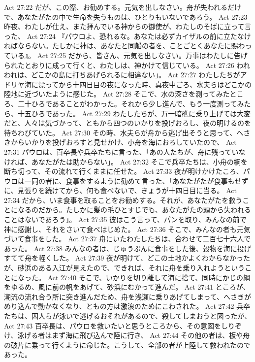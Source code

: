 Act 27:22  だが、この際、お勧めする。元気を出しなさい。舟が失われるだけで、あなたがたの中で生命を失うものは、ひとりもいないであろう。
Act 27:23  昨夜、わたしが仕え、また拝んでいる神からの御使が、わたしのそばに立って言った、
Act 27:24  『パウロよ、恐れるな。あなたは必ずカイザルの前に立たなければならない。たしかに神は、あなたと同船の者を、ことごとくあなたに賜わっている』。
Act 27:25  だから、皆さん、元気を出しなさい。万事はわたしに告げられたとおりに成って行くと、わたしは、神かけて信じている。
Act 27:26  われわれは、どこかの島に打ちあげられるに相違ない」。
Act 27:27  わたしたちがアドリヤ海に漂ってから十四日目の夜になった時、真夜中ごろ、水夫らはどこかの陸地に近づいたように感じた。
Act 27:28  そこで、水の深さを測ってみたところ、二十ひろであることがわかった。それから少し進んで、もう一度測ってみたら、十五ひろであった。
Act 27:29  わたしたちが、万一暗礁に乗り上げては大変だと、人々は気づかって、ともから四つのいかりを投げおろし、夜の明けるのを待ちわびていた。
Act 27:30  その時、水夫らが舟から逃げ出そうと思って、へさきからいかりを投げおろすと見せかけ、小舟を海におろしていたので、
Act 27:31  パウロは、百卒長や兵卒たちに言った、「あの人たちが、舟に残っていなければ、あなたがたは助からない」。
Act 27:32  そこで兵卒たちは、小舟の綱を断ち切って、その流れて行くままに任せた。
Act 27:33  夜が明けかけたころ、パウロは一同の者に、食事をするように勧めて言った、「あなたがたが食事もせずに、見張りを続けてから、何も食べないで、きょうが十四日目に当る。
Act 27:34  だから、いま食事を取ることをお勧めする。それが、あなたがたを救うことになるのだから。たしかに髪の毛ひとすじでも、あなたがたの頭から失われることはないであろう」。
Act 27:35  彼はこう言って、パンを取り、みんなの前で神に感謝し、それをさいて食べはじめた。
Act 27:36  そこで、みんなの者も元気づいて食事をした。
Act 27:37  舟にいたわたしたちは、合わせて二百七十六人であった。
Act 27:38  みんなの者は、じゅうぶんに食事をした後、穀物を海に投げすてて舟を軽くした。
Act 27:39  夜が明けて、どこの土地かよくわからなかったが、砂浜のある入江が見えたので、できれば、それに舟を乗り入れようということになった。
Act 27:40  そこで、いかりを切り離して海に捨て、同時にかじの綱をゆるめ、風に前の帆をあげて、砂浜にむかって進んだ。
Act 27:41  ところが、潮流の流れ合う所に突き進んだため、舟を浅瀬に乗りあげてしまって、へさきがめり込んで動かなくなり、ともの方は激浪のためにこわされた。
Act 27:42  兵卒たちは、囚人らが泳いで逃げるおそれがあるので、殺してしまおうと図ったが、
Act 27:43  百卒長は、パウロを救いたいと思うところから、その意図をしりぞけ、泳げる者はまず海に飛び込んで陸に行き、
Act 27:44  その他の者は、板や舟の破片に乗って行くように命じた。こうして、全部の者が上陸して救われたのであった。
